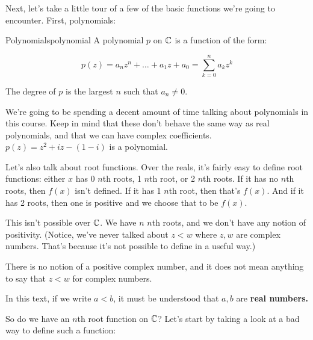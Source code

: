 Next, let's take a little tour of a few of the basic functions we're going to encounter. First, polynomials:

\begin{defbo}{Polynomials}{polynomial} A polynomial $p$ on $\mathbb{C}$ is a function of the form:

$$p(z) = a_nz^n + \dots + a_1z + a_0 = \sum_{k = 0}^n a_kz^k$$

The degree of $p$ is the largest $n$ such that $a_n \ne 0$.
\end{defbo}

We're going to be spending a decent amount of time talking about polynomials in this course. Keep in mind that these don't behave the same way as real polynomials, and that we can have complex coefficients. $p(z) = z^2 + iz - (1-i)$ is a polynomial.

Let's also talk about root functions. Over the reals, it's fairly easy to define root functions: either $x$ has 0 $n$th roots, 1 $n$th root, or 2 $n$th roots. If it has no $n$th roots, then $f(x)$ isn't defined. If it has 1 $n$th root, then that's $f(x)$. And if it has 2 roots, then one is positive and we choose that to be $f(x)$.

This isn't possible over $\mathbb{C}$. We have $n$ $n$th roots, and we don't have any notion of positivity. (Notice, we've never talked about $z < w$ where $z,w$ are complex numbers. That's because it's not possible to define in a useful way.)

\begin{note}\index{<}
There is no notion of a positive complex number, and it does not mean anything to say that $z < w$ for complex numbers.

In this text, if we write $a < b$, it must be understood that $a,b$ are {\bf real numbers.}
\end{note}

So do we have an $n$th root function on $\mathbb{C}$? Let's start by taking a look at a bad way to define such a function:

